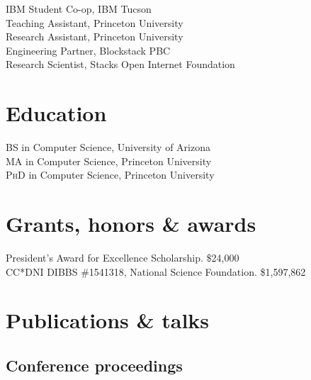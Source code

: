 \documentclass[11pt]{article} %
\begin{document}
IBM Student Co-op, IBM Tucson\\
Teaching Assistant, Princeton University\\
Research Assistant, Princeton University\\
Engineering Partner, Blockstack PBC\\
Research Scientist, Stacks Open Internet Foundation\\


\section*{Education}

\textsc{BS} in Computer Science, University of Arizona\\
\textsc{MA} in Computer Science, Princeton University\\
\textsc{PhD} in Computer Science, Princeton University\\


\section*{Grants, honors \& awards}

President's Award for Excellence Scholarship. \$24,000\\
CC*DNI DIBBS \#1541318, National Science Foundation. \$1,597,862\\


\section*{Publications \& talks}

\subsection*{Conference proceedings}
\end{document}
